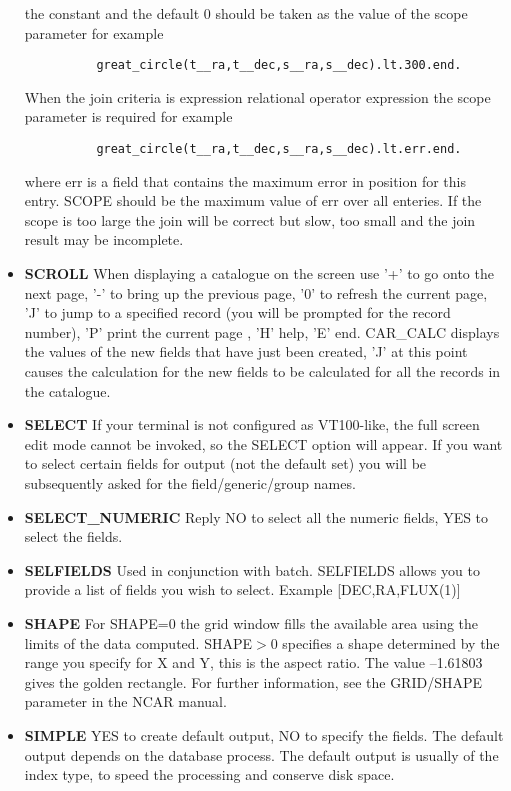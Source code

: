 \begin{itemize}
the constant and the default 0 should be taken as the value of the
scope parameter for example
\begin{verbatim}
          great_circle(t__ra,t__dec,s__ra,s__dec).lt.300.end.
\end{verbatim}
 When the join criteria is expression relational
operator expression the scope parameter is required for example
\begin{verbatim}
          great_circle(t__ra,t__dec,s__ra,s__dec).lt.err.end.
\end{verbatim}
where err is a field that contains the maximum error in position
for this entry. SCOPE should be the maximum value of err over all
enteries. If the scope is too large the join will be correct but
slow, too small and the join result may be incomplete.
\item{\bf SCROLL} When displaying a catalogue on the screen use '+' to go onto
the next page, '-' to bring up the previous page, '0' to refresh the current
page, 'J' to jump to a specified record (you will be prompted for the record
number), 'P' print the current page , 'H' help, 'E' end. CAR\_CALC displays the
values of the new fields that have just been created, 'J' at this point causes
the calculation for the new fields to be calculated for all the records in the
catalogue.
\item{\bf SELECT} If your terminal is not configured as VT100-like, the full
screen edit mode cannot be invoked, so the SELECT option will appear.
If you want to select certain fields for output (not the default set) you will
be subsequently asked for the field/generic/group names.
\item {\bf SELECT\_NUMERIC} Reply NO to select all the numeric fields, YES
to select the fields.
\item{\bf SELFIELDS} Used in conjunction with batch. SELFIELDS allows you to
provide a list of fields you wish to select. Example [DEC,RA,FLUX(1)]
\item{\bf SHAPE} For SHAPE=0 the grid window fills the available area using
the limits of the data computed.
SHAPE$>$0 specifies a shape determined by the range you specify for X and Y,
this is the aspect ratio.
The value --1.61803 gives the golden rectangle.
For further information, see the GRID/SHAPE parameter in the NCAR manual.
\item{\bf SIMPLE} YES to create default output, NO to specify the fields.
The default output depends on the database process.
The default output is usually of the index type, to speed the processing and
conserve disk space.

\end{itemize}

